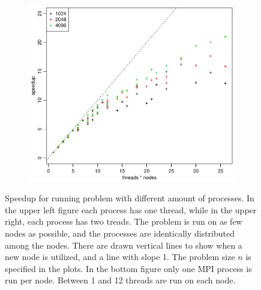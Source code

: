 \begin{figure}[h!]
  \quad
  \begin{subfigure}[b]{0.48\textwidth}
    \includegraphics[width=\textwidth]{./Figures/taskbSpeedupNodesTimesThreads.pdf}
  \end{subfigure}
  \vspace{1\baselineskip}
  \caption{Speedup for running problem with different amount of processes. In the upper left figure each process has one thread, while in the upper right, each process has two treads. The problem is run on as few nodes as possible, and the processes are identically distributed among the nodes. There are drawn vertical lines to show when a new node is utilized, and a line with slope 1. The problem size $n$ is specified in the plots. In the bottom figure only one MPI process is run per node. Between 1 and 12 threads are run on each node.}
  \label{fig:Speedup}
\end{figure}
%
